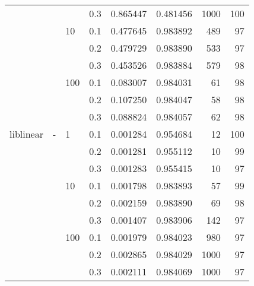 \begin{table}[H]
\begin{tabular}{llllrrrr}
          &   &     & 0.3 &  0.865447 &  0.481456 &    1000 &   100 \\
          &   & 10  & 0.1 &  0.477645 &  0.983892 &     489 &    97 \\
          &   &     & 0.2 &  0.479729 &  0.983890 &     533 &    97 \\
          &   &     & 0.3 &  0.453526 &  0.983884 &     579 &    98 \\
          &   & 100 & 0.1 &  0.083007 &  0.984031 &      61 &    98 \\
          &   &     & 0.2 &  0.107250 &  0.984047 &      58 &    98 \\
          &   &     & 0.3 &  0.088824 &  0.984057 &      62 &    98 \\
liblinear & - & 1   & 0.1 &  0.001284 &  0.954684 &      12 &   100 \\
          &   &     & 0.2 &  0.001281 &  0.955112 &      10 &    99 \\
          &   &     & 0.3 &  0.001283 &  0.955415 &      10 &    97 \\
          &   & 10  & 0.1 &  0.001798 &  0.983893 &      57 &    99 \\
          &   &     & 0.2 &  0.002159 &  0.983890 &      69 &    98 \\
          &   &     & 0.3 &  0.001407 &  0.983906 &     142 &    97 \\
          &   & 100 & 0.1 &  0.001979 &  0.984023 &     980 &    97 \\
          &   &     & 0.2 &  0.002865 &  0.984029 &    1000 &    97 \\
          &   &     & 0.3 &  0.002111 &  0.984069 &    1000 &    97 \\
\bottomrule
\end{tabular}
\end{table}
